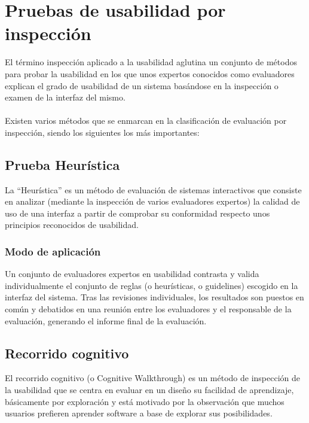 \section{Pruebas de usabilidad por inspección}
El término inspección aplicado a la usabilidad aglutina un conjunto de métodos para probar la usabilidad en los que unos expertos conocidos como evaluadores explican el grado de usabilidad de un sistema basándose en la inspección o examen de la interfaz del mismo. \\ \\
Existen varios métodos que se enmarcan en la clasificación de evaluación por inspección, siendo los siguientes los más importantes:

\subsection{Prueba Heurística}
La “Heurística” es un método de evaluación de sistemas interactivos que consiste en analizar (mediante la inspección de varios evaluadores expertos) la calidad de uso de una interfaz a partir de comprobar su conformidad respecto unos principios reconocidos de usabilidad.
\subsubsection{Modo de aplicación}
Un conjunto de evaluadores expertos en usabilidad contrasta y valida individualmente el conjunto de reglas (o heurísticas, o guidelines) escogido en la interfaz del sistema. Tras las revisiones individuales, los resultados son puestos en común y debatidos en una reunión entre los evaluadores y el responsable de la evaluación, generando el informe final de la evaluación.

\subsection{Recorrido cognitivo}
El recorrido cognitivo (o Cognitive Walkthrough) es un método de inspección de la usabilidad que se centra en evaluar en un diseño su facilidad de aprendizaje, básicamente por exploración y está motivado por la observación que muchos usuarios prefieren aprender software a base de explorar sus posibilidades.
